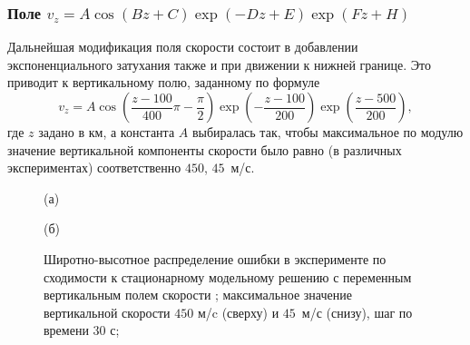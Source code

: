 \documentclass[14pt, a4paper]{extarticle}
\begin{document}
\subsubsection{Поле $v_z = A\cos(Bz+C)\exp(-Dz+E)\exp(Fz+H)$}

Дальнейшая модификация поля скорости состоит в добавлении экспоненциального затухания также и при движении к нижней границе. Это приводит к вертикальному полю, заданному по формуле  
\begin{equation}\label{cosexp}
v_z = A\cos\left(\dfrac{z-100}{400}\pi - \dfrac{\pi}{2}\right)\exp\left(-\dfrac{z-100}{200}\right)\exp\left(\dfrac{z-500}{200}\right),
\end{equation}
где $z$ задано в км, а константа $A$ выбиралась так, чтобы максимальное по модулю значение вертикальной компоненты скорости было равно (в различных экспериментах) соответственно $450$, $45$~м/с.



\begin{figure}[H]

(а)

\end{figure}

\begin{figure}[H]

(б)


\caption{Широтно-высотное распределение ошибки в эксперименте по сходимости к стационарному модельному решению с переменным вертикальным полем скорости  ; максимальное значение вертикальной скорости $450$ м/c (сверху) и $45$~м/с (снизу), шаг по времени $30$ с; }
\end{figure}
\end{document}
